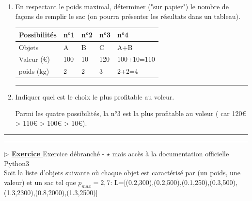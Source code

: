 \documentclass[12pt,french]{article}
\newcounter{npb}
\newcommand{\exo}{
    \stepcounter{npb}
    {\textbf{$\triangleright$ \underline{Exercice \arabic{npb} }}}
}
\begin{document}
\begin{enumerate}

	\item En respectant le poids maximal, déterminer ("sur papier") le nombre de façons de remplir le sac (on pourra présenter les résultats dans un tableau).
	\begin{tcolorbox}[enhanced,attach boxed title to top center={yshift=-3mm,yshifttext=-1mm},
		colback=blue!5!white,colframe=blue!75!black,colbacktitle=blue!25!black,
		title=solution :, fonttitle=\bfseries,
		boxed title style={size=small,colframe=green!25!black} ]
	\begin{center}
		\begin{tabular}{ | m{2cm} | m{2cm} | m{2cm}| m{2cm} | m{2cm} |} 
			\hline
			Possibilités&n°1&n°2 & n°3 &n°4\\ 
			\hline
			Objets&A& B & C&A+B \\ 
			\hline
			Valeur (€)&100 & 10 & 120 &100+10=110\\ 
			\hline
			poids (kg)&2& 2 & 3 &2+2=4\\ 
			\hline
		\end{tabular}
	\end{center}
\end{tcolorbox}
	\hrule 
	\item Indiquer quel est le choix le plus profitable au voleur.
	\begin{tcolorbox}[enhanced,attach boxed title to top center={yshift=-3mm,yshifttext=-1mm},
		colback=blue!5!white,colframe=blue!75!black,colbacktitle=blue!25!black,
		title=solution :, fonttitle=\bfseries,
		boxed title style={size=small,colframe=green!25!black} ]
	Parmi les quatre possibilités, la n°3 est la plus profitable au voleur ( car 120€ > 110€ > 100€ > 10€).
\end{tcolorbox}
	
\end{enumerate}
\hrule
\hrule
\medskip
\exo Exercice débranché - $\star$  mais accès à la documentation officielle Python3\\
Soit la liste d'objets suivante où chaque objet est caractérisé par (un poids, une valeur) et un sac tel que $p_{max}=2,7$:\newline
L=[(0.2,300),(0.2,500),(0.1,250),(0.3,500),(1.3,2300),(0.8,2000),(1.3,2500)]
\vspace{2mm}
\end{document}
